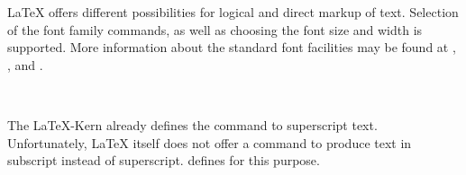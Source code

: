 {\LaTeX} offers different possibilities for logical and direct
markup of text.
Selection of the
font family commands, as well as choosing the font size and width is
supported. More information about the standard font facilities may be found at
\cite{lshort}, \cite{latex:usrguide}, and \cite{latex:fntguide}.


\begin{Declaration}
  \\
\end{Declaration}
%
%
The \LaTeX-Kern already defines the command
 to
superscript text. Unfortunately,
{\LaTeX} itself does not offer a command to produce text in
subscript instead of
superscript. {\KOMAScript}
defines  for this purpose.

